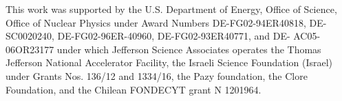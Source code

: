 \documentclass[3p,twocolumn]{elsarticle}
\begin{document}
This work was supported by the U.S. Department of Energy, Office of Science, Office of Nuclear Physics under Award Numbers DE-FG02-94ER40818, DE-SC0020240, DE-FG02-96ER-40960, DE-FG02-93ER40771, and DE- AC05-06OR23177 under which Jefferson Science Associates operates the Thomas Jefferson National Accelerator Facility, the Israeli Science Foundation (Israel) under Grants Nos. 136/12 and 1334/16, the Pazy foundation, the Clore Foundation, and the Chilean FONDECYT grant N 1201964.





 


%
%
\end{document}
